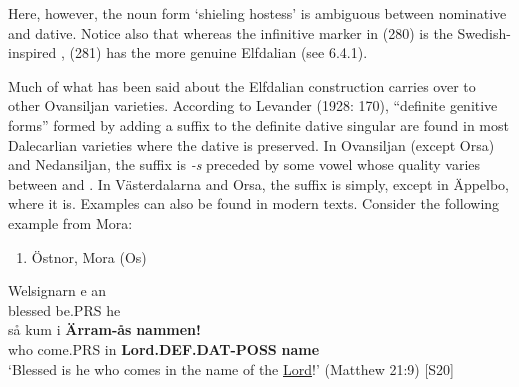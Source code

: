 Here, however, the noun form  ‘shieling hostess’ is ambiguous between nominative and dative. Notice also that whereas the infinitive marker in (280) is the Swedish-inspired , (281) has the more genuine Elfdalian  (see 6.4.1). 

Much of what has been said about the Elfdalian construction carries over to other Ovansiljan varieties. According to Levander (1928: 170), “definite genitive forms” formed by adding a suffix to the definite dative singular are found in most Dalecarlian varieties where the dative is preserved. In Ovansiljan (except Orsa) and Nedansiljan, the suffix is\textit{ {}-s} preceded by some vowel whose quality varies between  and . In Västerdalarna and Orsa, the suffix is simply, except in Äppelbo, where it is. Examples can also be found in modern texts. Consider the following example from Mora:

\begin{enumerate} %
\item 
Östnor, Mora (Os)

\end{enumerate} %
\ea\label{}
\gll Welsignarn  e  an\\


blessed  be.PRS  he\\ %


\ea\label{}
\gll så  kum  i  \textbf{Ärram-ås} \textbf{nammen!}\\


who  come.PRS  in  \textbf{Lord.DEF.DAT-POSS} \textbf{name}\\ %


‘Blessed is he who comes in the name of the \href{http://www.godrules.net/library/topics/topic1192.htm}{Lord}!’ (Matthew 21:9) [S20]
\z


